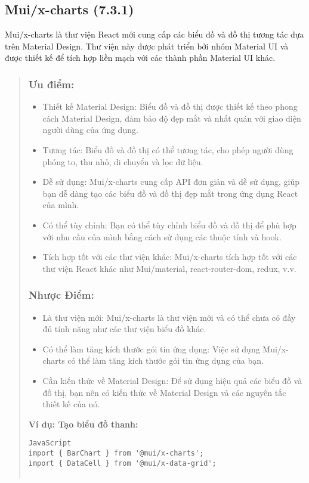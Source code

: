 \subsection{Mui/x-charts (7.3.1)}
Mui/x-charts là thư viện React mới cung cấp các biểu đồ và đồ thị tương tác dựa trên Material Design. Thư viện này được phát triển bởi nhóm Material UI và được thiết kế để tích hợp liền mạch với các thành phần Material UI khác.

\begin{quote}
\subsubsection{Ưu điểm:}
\begin{itemize}

  \item Thiết kế Material Design: Biểu đồ và đồ thị được thiết kế theo phong cách Material Design, đảm bảo độ đẹp mắt và nhất quán với giao diện người dùng của ứng dụng.
  \item Tương tác: Biểu đồ và đồ thị có thể tương tác, cho phép người dùng phóng to, thu nhỏ, di chuyển và lọc dữ liệu.
  \item Dễ sử dụng: Mui/x-charts cung cấp API đơn giản và dễ sử dụng, giúp bạn dễ dàng tạo các biểu đồ và đồ thị đẹp mắt trong ứng dụng React của mình.
  \item Có thể tùy chỉnh: Bạn có thể tùy chỉnh biểu đồ và đồ thị để phù hợp với nhu cầu của mình bằng cách sử dụng các thuộc tính và hook.
  \item Tích hợp tốt với các thư viện khác: Mui/x-charts tích hợp tốt với các thư viện React khác như Mui/material, react-router-dom, redux, v.v.
\end{itemize}

\subsubsection{Nhược Điểm:}

\begin{itemize}
  \item Là thư viện mới: Mui/x-charts là thư viện mới và có thể chưa có đầy đủ tính năng như các thư viện biểu đồ khác.
  \item Có thể làm tăng kích thước gói tin ứng dụng: Việc sử dụng Mui/x-charts có thể làm tăng kích thước gói tin ứng dụng của bạn.

  \item Cần kiến thức về Material Design: Để sử dụng hiệu quả các biểu đồ và đồ thị, bạn nên có kiến thức về Material Design và các nguyên tắc thiết kế của nó.
\end{itemize}
\textbf{Ví dụ: Tạo biểu đồ thanh:}
\begin{lstlisting}
JavaScript
import { BarChart } from '@mui/x-charts';
import { DataCell } from '@mui/x-data-grid';


\end{lstlisting}
\end{quote}

